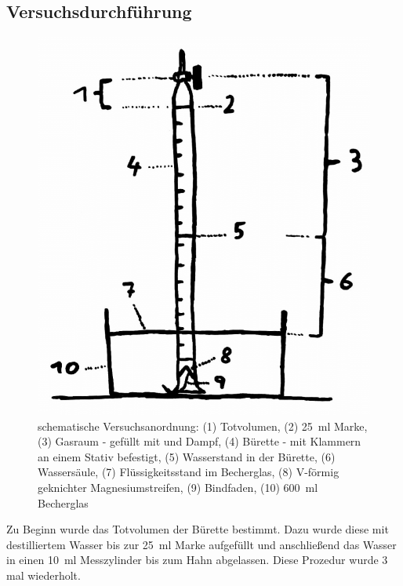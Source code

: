 \documentclass{article}
\begin{document}
    \pagebreak
    
    \subsection{Versuchsdurchführung} \label{sec:Versuch}
    
    \begin{figure}[h]
      \includegraphics[scale=0.3, center]{Graphiken/Versuchsanordnungen/VersuchsanordnungMagnesium.png} 
      \caption[schematische Versuchsanordnung, Quelle: Autor]{schematische Versuchsanordnung: (1) Totvolumen, (2) \SI[mode=text]{25}{\milli\litre} Marke, (3) Gasraum - gefüllt mit  und  Dampf, (4) Bürette - mit Klammern an einem Stativ befestigt, (5) Wasserstand in der Bürette, (6) Wassersäule, (7) Flüssigkeitsstand im Becherglas, (8) V-förmig geknichter Magnesiumstreifen, (9) Bindfaden, (10) \SI[mode=text]{600}{\milli\litre} Becherglas}
      \label{fig:Versuchsanordnung}
    \end{figure}
    
    Zu Beginn wurde das Totvolumen der Bürette bestimmt. Dazu wurde diese mit destilliertem Wasser bis zur \SI[mode=text]{25}{\milli\litre} Marke aufgefüllt und anschließend das Wasser in einen \SI[mode=text]{10}{\milli\litre} Messzylinder bis zum Hahn abgelassen. Diese Prozedur wurde 3 mal wiederholt.\\
    
\end{document}
